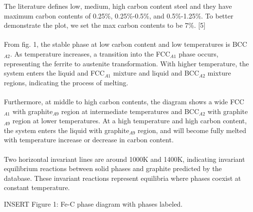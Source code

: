 \documentclass[11pt]{article}
\begin{document}
\noindent The literature defines low, medium, high carbon content steel and they have maximum carbon contents of 0.25\%, 0.25\%-0.5\%, and 0.5\%-1.25\%. To better demonstrate the plot, we set the max carbon contents to be 7\%. [5]
\\~\\
From fig. 1, the stable phase at low carbon content and low temperatures is BCC$_{A2}$. As temperature increases, a transition into the FCC$_{A1}$ phase occurs, representing the ferrite to austenite transformation. With higher temperature, the system enters the liquid and FCC$_{A1}$ mixture and liquid and BCC$_{A2}$ mixture regions, indicating the process of melting.
\\~\\
Furthermore, at middle to high carbon contents, the diagram shows a wide FCC$_{A1}$ with graphite$_{A9}$ region at intermediate temperatures and BCC$_{A2}$ with graphite$_{A9}$ region at lower temperatures. At a high temperature and high carbon content, the system enters the liquid with graphite$_{A9}$ region, and will become fully melted with temperature increase or decrease in carbon content.
\\~\\
Two horizontal invariant lines are around 1000K and 1400K, indicating invariant equilibrium reactions between solid phases and graphite predicted by the database. These invariant reactions represent equilibria where phases coexist at constant temperature.

\begin{center}
    INSERT Figure 1: Fe-C phase diagram with phases labeled. 
\end{center}
\end{document}
